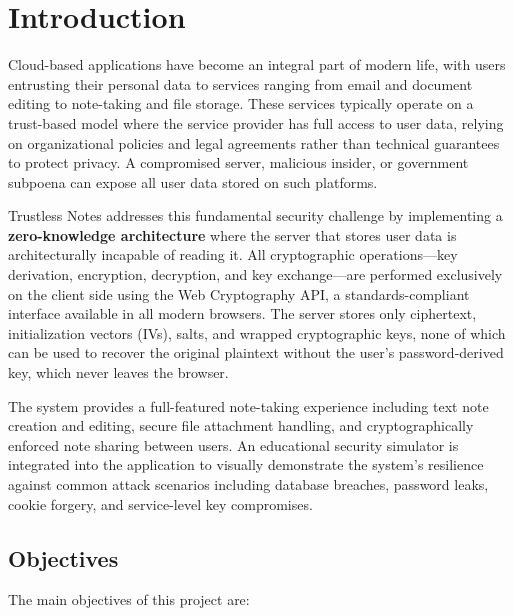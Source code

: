 
\chapter{Introduction}

Cloud-based applications have become an integral part of modern life, with users entrusting their personal data to services ranging from email and document editing to note-taking and file storage. These services typically operate on a trust-based model where the service provider has full access to user data, relying on organizational policies and legal agreements rather than technical guarantees to protect privacy. A compromised server, malicious insider, or government subpoena can expose all user data stored on such platforms.

Trustless Notes addresses this fundamental security challenge by implementing a \textbf{zero-knowledge architecture} where the server that stores user data is architecturally incapable of reading it. All cryptographic operations---key derivation, encryption, decryption, and key exchange---are performed exclusively on the client side using the Web Cryptography API, a standards-compliant interface available in all modern browsers. The server stores only ciphertext, initialization vectors (IVs), salts, and wrapped cryptographic keys, none of which can be used to recover the original plaintext without the user's password-derived key, which never leaves the browser.

The system provides a full-featured note-taking experience including text note creation and editing, secure file attachment handling, and cryptographically enforced note sharing between users. An educational security simulator is integrated into the application to visually demonstrate the system's resilience against common attack scenarios including database breaches, password leaks, cookie forgery, and service-level key compromises.

\section{Objectives}

The main objectives of this project are:

